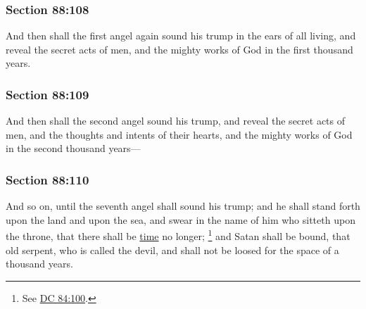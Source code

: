 	\subsubsection{Section 88:108} %
		\label{DC88-108}

		And then shall the first angel again sound his trump in the ears of all living, and reveal the secret acts of men, and the mighty works of God in the first thousand years.


	\subsubsection{Section 88:109} %
		\label{DC88-109}

		And then shall the second angel sound his trump, and reveal the secret acts of men, and the thoughts and intents of their hearts, and the mighty works of God in the second thousand years---


	\subsubsection{Section 88:110} %
		\label{DC88-110}

		And so on, until the seventh angel shall sound his trump; and he shall stand forth upon the land and upon the sea, and swear in the name of him who sitteth upon the throne, that there shall be \hyperref[TIME]{time} no longer;%
			\footnote{%
				See \hyperref[DC84-100]{DC 84:100}.
				}
		and Satan shall be bound, that old serpent, who is called the devil, and shall not be loosed for the space of a thousand years.

